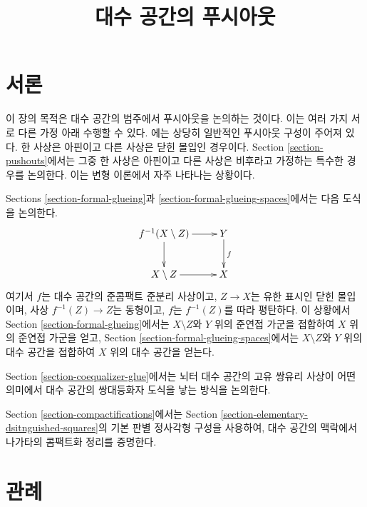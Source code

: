 

%


\title{대수 공간의 푸시아웃}


\maketitle

\label{section-phantom}

\tableofcontents

\section{서론}
\label{section-introduction}

\noindent
이 장의 목적은 대수 공간의 범주에서 푸시아웃을 논의하는 것이다.
이는 여러 가지 서로 다른 가정 아래 수행할 수 있다.
\cite{Temkin-Tyomkin}에는 상당히 일반적인 푸시아웃 구성이 주어져 있다.
한 사상은 아핀이고 다른 사상은 닫힌 몰입인 경우이다.
Section \ref{section-pushouts}에서는 그중 한 사상은 아핀이고
다른 사상은 비후라고 가정하는 특수한 경우를 논의한다.
이는 변형 이론에서 자주 나타나는 상황이다.

\medskip\noindent
Sections \ref{section-formal-glueing}과
\ref{section-formal-glueing-spaces}에서는 다음 도식을 논의한다.
$$
\xymatrix{
f^{-1}(X \setminus Z) \ar[r] \ar[d] & Y \ar[d]^f \\
X \setminus Z \ar[r] & X
}
$$
여기서 $f$는 대수 공간의 준콤팩트 준분리 사상이고,
$Z \to X$는 유한 표시인 닫힌 몰입이며,
사상 $f^{-1}(Z) \to Z$는 동형이고,
$f$는 $f^{-1}(Z)$를 따라 평탄하다. 이 상황에서
Section \ref{section-formal-glueing}에서는 $X \setminus Z$와 $Y$ 위의
준연접 가군을 접합하여 $X$ 위의 준연접 가군을 얻고,
Section \ref{section-formal-glueing-spaces}에서는
$X \setminus Z$와 $Y$ 위의 대수 공간을 접합하여
$X$ 위의 대수 공간을 얻는다.

\medskip\noindent
Section \ref{section-coequalizer-glue}에서는
뇌터 대수 공간의 고유 쌍유리 사상이 어떤 의미에서
대수 공간의 쌍대등화자 도식을 낳는 방식을 논의한다.

\medskip\noindent
Section \ref{section-compactifications}에서는
Section \ref{section-elementary-dsitnguished-squares}의
기본 판별 정사각형 구성을 사용하여, 대수 공간의 맥락에서
나가타의 콤팩트화 정리를 증명한다.






\section{관례}
\label{section-conventions}


